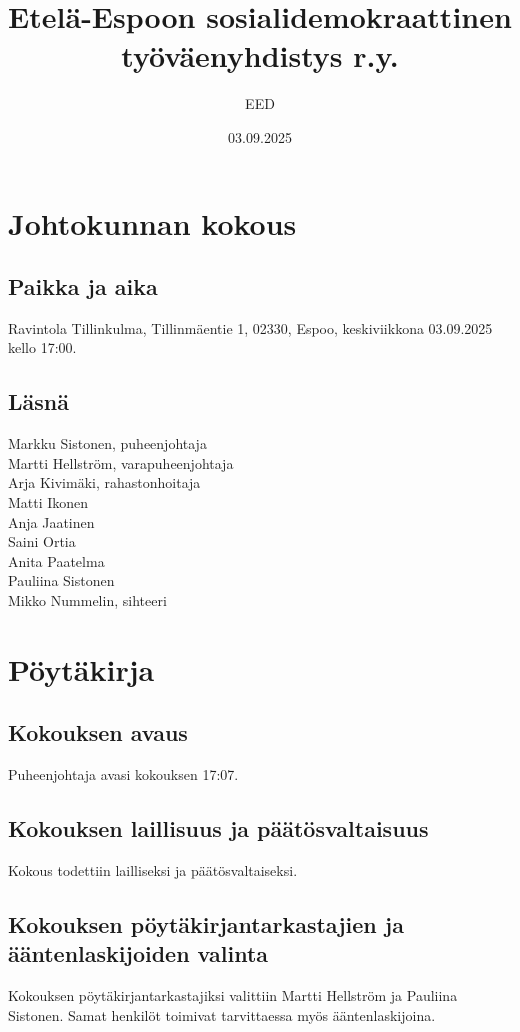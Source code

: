 \documentclass[a4paper,12pt]{article}
\title{Etelä-Espoon sosialidemokraattinen työväenyhdistys r.y.}
\author{EED}
\date{03.09.2025}
\begin{document}
\maketitle
\section*{Johtokunnan kokous}
\subsection*{Paikka ja aika}
Ravintola Tillinkulma, Tillinmäentie 1, 02330, Espoo, keskiviikkona 03.09.2025 kello 17:00.
\subsection*{Läsnä}
Markku Sistonen, puheenjohtaja \\
Martti Hellström, varapuheenjohtaja \\
Arja Kivimäki, rahastonhoitaja \\
Matti Ikonen \\
Anja Jaatinen \\
Saini Ortia \\
Anita Paatelma \\
Pauliina Sistonen \\
Mikko Nummelin, sihteeri
\section*{Pöytäkirja}
\subsection{Kokouksen avaus}
Puheenjohtaja avasi kokouksen 17:07.
\subsection{Kokouksen laillisuus ja päätösvaltaisuus}
Kokous todettiin lailliseksi ja päätösvaltaiseksi.
\subsection{Kokouksen pöytäkirjantarkastajien ja ääntenlaskijoiden valinta}
Kokouksen pöytäkirjantarkastajiksi valittiin Martti Hellström ja Pauliina Sistonen. Samat henkilöt toimivat tarvittaessa myös ääntenlaskijoina.
\end{document}

